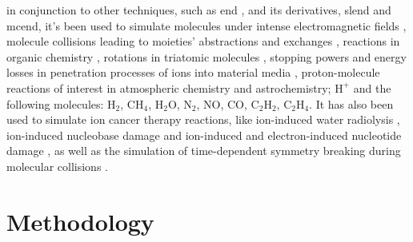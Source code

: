 \documentclass{aux/ttuthes2007}
\begin{document}
in conjunction to other techniques, such as \gls{end} , and its derivatives, \gls{slend} and \gls{mcend}, it's been used to simulate molecules under intense electromagnetic fields , molecule collisions leading to moieties' abstractions and exchanges , reactions in organic chemistry , rotations in triatomic molecules , 
stopping powers and energy losses in penetration processes of ions into material media ,
proton-molecule reactions of interest in atmospheric chemistry and astrochemistry; $\text{H}^+$ and the following molecules: $\text{H}_2$, C$\text{H}_4$, $\text{H}_2$O, $\text{N}_2$, NO, CO, $\text{C}_2$$\text{H}_2$, $\text{C}_2$$\text{H}_4$.
It has also been used to simulate ion cancer therapy reactions, like ion-induced water radiolysis , ion-induced nucleobase damage  and ion-induced and electron-induced nucleotide damage ,
as well as the simulation of time-dependent symmetry breaking during molecular collisions .

\chapter{\textbf{Methodology}}\label{chap:methodology}
\end{document}
